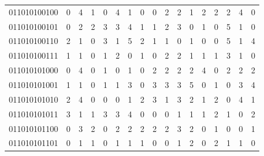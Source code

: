\documentclass[10pt,a4paper]{article}
\begin{document}
\begin{longtable}{ |c|c|c|c|c|c|c|c|c|c|c|c|c|c|c|c|c| }
    011010100100              & 0                            & 4                                & 1                            & 0                              & 4   & 1   & 0   & 0   & 2   & 2   & 1   & 2   & 2   & 2   & 4   & 0   \\
    011010100101              & 0                            & 2                                & 2                            & 3                              & 3   & 4   & 1   & 1   & 2   & 3   & 0   & 1   & 0   & 5   & 1   & 0   \\
    011010100110              & 2                            & 1                                & 0                            & 3                              & 1   & 5   & 2   & 1   & 1   & 0   & 1   & 0   & 0   & 5   & 1   & 4   \\
    011010100111              & 1                            & 1                                & 0                            & 1                              & 2   & 0   & 1   & 0   & 2   & 2   & 1   & 1   & 1   & 3   & 1   & 0   \\
    011010101000              & 0                            & 4                                & 0                            & 1                              & 0   & 1   & 0   & 2   & 2   & 2   & 2   & 4   & 0   & 2   & 2   & 2   \\
    011010101001              & 1                            & 1                                & 0                            & 1                              & 1   & 3   & 0   & 3   & 3   & 3   & 5   & 0   & 1   & 0   & 3   & 4   \\
    011010101010              & 2                            & 4                                & 0                            & 0                              & 0   & 1   & 2   & 3   & 1   & 3   & 2   & 1   & 2   & 0   & 4   & 1   \\
    011010101011              & 3                            & 1                                & 1                            & 3                              & 3   & 4   & 0   & 0   & 0   & 1   & 1   & 1   & 2   & 1   & 0   & 2   \\
    011010101100              & 0                            & 3                                & 2                            & 0                              & 2   & 2   & 2   & 2   & 2   & 3   & 2   & 0   & 1   & 0   & 0   & 1   \\
    011010101101              & 0                            & 1                                & 1                            & 0                              & 1   & 1   & 1   & 0   & 0   & 1   & 2   & 0   & 2   & 1   & 1   & 0   \\

\end{longtable}
\end{document}
